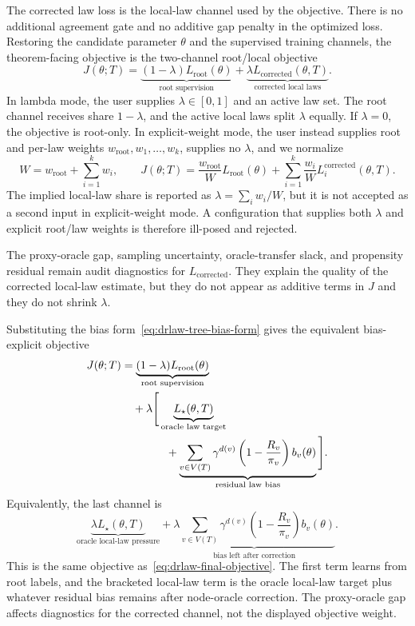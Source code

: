 The corrected law loss is the local-law channel used by the objective.
There is no additional agreement gate and no additive gap penalty in
the optimized loss. Restoring the candidate parameter \(\theta\) and
the supervised training channels, the theorem-facing objective is the
two-channel root/local objective
\begin{equation}
\label{eq:drlaw-final-objective}
  J(\theta;T)
  =
  \underbrace{
  (1-\lambda)
  L_{\mathrm{root}}(\theta)
  }_{\text{root supervision}}
  +
  \underbrace{
    \lambda L_{\mathrm{corrected}}(\theta,T)
  }_{\text{corrected local laws}} .
\end{equation}
In lambda mode, the user supplies \(\lambda\in[0,1]\) and an active law
set. The root channel receives share \(1-\lambda\), and the active
local laws split \(\lambda\) equally. If \(\lambda=0\), the objective is
root-only. In explicit-weight mode, the user instead supplies root and
per-law weights \(w_{\mathrm{root}}, w_1,\ldots,w_k\), supplies no
\(\lambda\), and we normalize
\[
  W = w_{\mathrm{root}}+\sum_{i=1}^k w_i,
  \qquad
  J(\theta;T)
  =
  \frac{w_{\mathrm{root}}}{W}L_{\mathrm{root}}(\theta)
  +
  \sum_{i=1}^k \frac{w_i}{W}L_i^{\mathrm{corrected}}(\theta,T).
\]
The implied local-law share is reported as
\(\lambda=\sum_i w_i/W\), but it is not accepted as a second input in
explicit-weight mode. A configuration that supplies both \(\lambda\)
and explicit root/law weights is therefore ill-posed and rejected.

The proxy-oracle gap, sampling uncertainty, oracle-transfer slack, and
propensity residual remain audit diagnostics for
\(L_{\mathrm{corrected}}\). They explain the quality of the corrected
local-law estimate, but they do not appear as additive terms in \(J\)
and they do not shrink \(\lambda\).

Substituting the bias form~\eqref{eq:drlaw-tree-bias-form} gives the
equivalent bias-explicit objective
\begin{align}
\label{eq:drlaw-final-objective-bias-form}
  J(\theta;T)
  &=
  \underbrace{
    (1-\lambda)
    L_{\mathrm{root}}(\theta)
  }_{\text{root supervision}}
  \notag\\
  &\quad+
  \lambda
  \Bigg[
    \underbrace{L_\star(\theta,T)}_{\text{oracle law target}}
    \notag\\
  &\qquad\qquad+
    \underbrace{
      \sum_{v\in V(T)}
      \gamma^{d(v)}
      \left(1-\frac{R_v}{\pi_v}\right)b_v(\theta)
    }_{\text{residual law bias}}
  \Bigg].
\end{align}
Equivalently, the last channel is
\[
  \underbrace{
    \lambda L_\star(\theta,T)
  }_{\text{oracle local-law pressure}}
  +
  \underbrace{
    \lambda
    \sum_{v\in V(T)}
    \gamma^{d(v)}
    \left(1-\frac{R_v}{\pi_v}\right)b_v(\theta)
  }_{\text{bias left after correction}} .
\]
This is the same objective as~\eqref{eq:drlaw-final-objective}. The
first term learns from root labels, and the bracketed local-law term is
the oracle local-law target plus whatever residual bias remains after
node-oracle correction. The proxy-oracle gap affects diagnostics for
the corrected channel, not the displayed objective weight.

